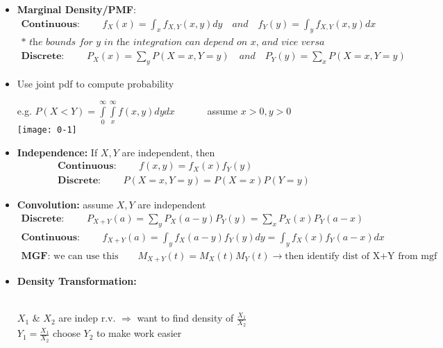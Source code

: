 \begin{itemize}
	\item \textbf{Marginal Density/PMF}:
	\begin{gather*}
		\textbf{Continuous: }\quad \quad f_X(x) = \int_x f_{X,Y}(x,y)dy \quad \textit{and} \quad f_Y(y) = \int_y f_{X,Y}(x,y)dx\\
		\textit{* the bounds for y in the integration can depend on x, and vice versa}\\
		\textbf{Discrete: }\quad \quad P_X(x) = \sum\limits_y P(X=x,Y=y) \quad \textit{and} \quad P_Y(y) = \sum\limits_x P(X=x,Y=y) 
	\end{gather*}
	\item Use joint pdf to compute probability
	\begin{center}
		e.g. $P(X < Y) = \int\limits_0^\infty \int\limits_x^\infty f(x,y)dy dx \quad \quad \quad$ assume $x>0, y>0$\\
		\texttt{[image: 0-1]}
	\end{center}
	\item \textbf{Independence: } If $X,Y$ are independent, then 
	\begin{gather*}
		\textbf{Continuous: }\quad \quad f(x,y) = f_X(x)f_Y(y)\\
		\textbf{Discrete: }\quad \quad P(X=x, Y=y) = P(X=x) P(Y=y)
	\end{gather*}
	\item \textbf{Convolution: } assume $X,Y$ are independent
	\begin{gather*}
		\textbf{Discrete: }\quad \quad P_{X+Y}(a) = \sum\limits_y P_X(a-y)P_Y(y) = \sum\limits_x P_X(x)P_Y(a-x)\\
		\textbf{Continuous: }\quad \quad f_{X+Y}(a) = \int_y f_X(a-y)f_Y(y)dy = \int_y f_X(x)f_Y(a-x)dx\\
		\textbf{MGF: }\text{we can use this} \quad \quad M_{X+Y}(t) = M_X(t) M_Y(t) \longrightarrow \text{then identify dist of X+Y from mgf} 
	\end{gather*}
	\item \textbf{Density Transformation: }
	\begin{center}
		\\$X_1$ \& $X_2$ are indep r.v. $\Rightarrow$ want to find density of $\frac{X_1}{X_2}$\\
		$Y_1 = \frac{X_1}{X_2}$ \qquad choose $Y_2$ to make work easier
	\end{center}
\end{itemize}
